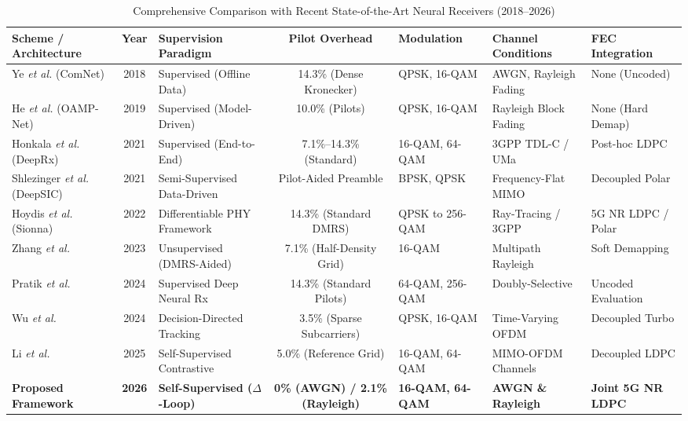 ﻿\documentclass[journal,twoside]{IEEEtran}
\begin{document}
\begin{table}[t]
\caption{Comprehensive Comparison with Recent State-of-the-Art Neural Receivers (2018--2026)}
\label{tab:sota_comparison}
\centering
\footnotesize
\setlength{\tabcolsep}{3pt}
\begin{tabularx}{\textwidth}{l c p{3.1cm} c p{2.2cm} p{2.5cm} X}
\toprule
\textbf{Scheme / Architecture} & \textbf{Year} & \textbf{Supervision Paradigm} & \textbf{Pilot Overhead} & \textbf{Modulation} & \textbf{Channel Conditions} & \textbf{FEC Integration} \\
\midrule
Ye \textit{et al.} (ComNet) \cite{ye2018}          & 2018 & Supervised (Offline Data)   & 14.3\% (Dense Kronecker)  & QPSK, 16-QAM        & AWGN, Rayleigh Fading & None (Uncoded) \\
He \textit{et al.} (OAMP-Net) \cite{he2019}        & 2019 & Supervised (Model-Driven)   & 10.0\% (Pilots)           & QPSK, 16-QAM        & Rayleigh Block Fading & None (Hard Demap) \\
Honkala \textit{et al.} (DeepRx) \cite{honkala2021}& 2021 & Supervised (End-to-End)     & 7.1\%--14.3\% (Standard)  & 16-QAM, 64-QAM      & 3GPP TDL-C / UMa      & Post-hoc LDPC \\
Shlezinger \textit{et al.} (DeepSIC) \cite{shlezinger2021}& 2021 & Semi-Supervised Data-Driven & Pilot-Aided Preamble      & BPSK, QPSK          & Frequency-Flat MIMO   & Decoupled Polar \\
Hoydis \textit{et al.} (Sionna) \cite{hoydis2022}  & 2022 & Differentiable PHY Framework& 14.3\% (Standard DMRS)    & QPSK to 256-QAM     & Ray-Tracing / 3GPP    & 5G NR LDPC / Polar \\
Zhang \textit{et al.} \cite{zhang2023}             & 2023 & Unsupervised (DMRS-Aided)   & 7.1\% (Half-Density Grid) & 16-QAM              & Multipath Rayleigh    & Soft Demapping \\
Pratik \textit{et al.} \cite{pratik2024}           & 2024 & Supervised Deep Neural Rx   & 14.3\% (Standard Pilots)  & 64-QAM, 256-QAM     & Doubly-Selective      & Uncoded Evaluation \\
Wu \textit{et al.} \cite{wu2024}                   & 2024 & Decision-Directed Tracking  & 3.5\% (Sparse Subcarriers)& QPSK, 16-QAM        & Time-Varying OFDM     & Decoupled Turbo \\
Li \textit{et al.} \cite{li2025}                   & 2025 & Self-Supervised Contrastive & 5.0\% (Reference Grid)    & 16-QAM, 64-QAM      & MIMO-OFDM Channels    & Decoupled LDPC \\
\textbf{Proposed Framework}                        & \textbf{2026} & \textbf{Self-Supervised ($\Delta$-Loop)} & \textbf{0\% (AWGN) / 2.1\% (Rayleigh)} & \textbf{16-QAM, 64-QAM} & \textbf{AWGN \& Rayleigh} & \textbf{Joint 5G NR LDPC} \\
\bottomrule
\end{tabularx}
\end{table}
\end{document}
